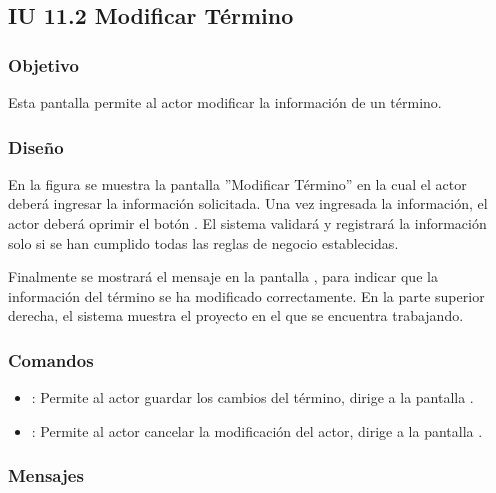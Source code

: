 \subsection{IU 11.2 Modificar Término}

\subsubsection{Objetivo}
	Esta pantalla permite al actor modificar la información de un término.
\subsubsection{Diseño}
	En la figura  se muestra la pantalla ''Modificar Término'' en la cual el actor deberá ingresar la información solicitada.
	Una vez ingresada la información, el actor deberá oprimir el botón  . El sistema validará y registrará la información solo si se han cumplido todas las reglas de negocio establecidas.
	
	Finalmente se mostrará el mensaje  en la pantalla , para indicar que la información del término se ha modificado correctamente.
	En la parte superior derecha, el sistema muestra el proyecto en el que se encuentra trabajando.

\subsubsection{Comandos}
\begin{itemize}
	\item {}: Permite al actor guardar los cambios del término, dirige a la pantalla .
	\item {}: Permite al actor cancelar la modificación del actor, dirige a la pantalla .
\end{itemize}

\subsubsection{Mensajes}


